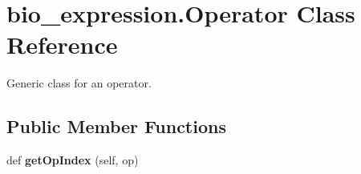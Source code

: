 \hypertarget{classbio__expression_1_1_operator}{}\section{bio\+\_\+expression.\+Operator Class Reference}
\label{classbio__expression_1_1_operator}


Generic class for an operator.  


\subsection*{Public Member Functions}
\begin{DoxyCompactItemize}
\item 
def {\bfseries get\+Op\+Index} (self, op)\hypertarget{classbio__expression_1_1_operator_a04ec9d58753fadcf98c7a2197812b742}{}\label{classbio__expression_1_1_operator_a04ec9d58753fadcf98c7a2197812b742}

\end{DoxyCompactItemize}
